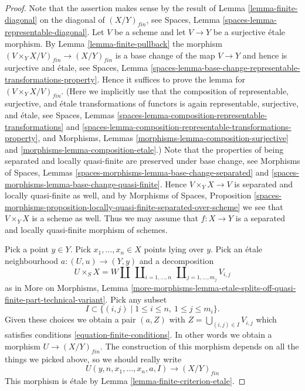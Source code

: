 \begin{proof}
Note that the assertion makes sense by the result of
Lemma \ref{lemma-finite-diagonal}
on the diagonal of $(X/Y)_{fin}$, see
Spaces, Lemma \ref{spaces-lemma-representable-diagonal}.
Let $V$ be a scheme and let $V \to Y$ be a surjective \'etale morphism. By
Lemma \ref{lemma-finite-pullback}
the morphism $(V \times_Y X/V)_{fin} \to (X/Y)_{fin}$ is
a base change of the map $V \to Y$ and hence is surjective and \'etale, see
Spaces,
Lemma \ref{spaces-lemma-base-change-representable-transformations-property}.
Hence it suffices to prove the lemma for $(V \times_Y X/V)_{fin}$.
(Here we implicitly use that the composition of representable, surjective, and
\'etale transformations of functors is again representable, surjective, and
\'etale, see
Spaces, Lemmas \ref{spaces-lemma-composition-representable-transformations} and
\ref{spaces-lemma-composition-representable-transformations-property}, and
Morphisms, Lemmas \ref{morphisms-lemma-composition-surjective} and
\ref{morphisms-lemma-composition-etale}.)
Note that the properties of being separated and locally quasi-finite
are preserved under base change, see
Morphisms of Spaces,
Lemmas \ref{spaces-morphisms-lemma-base-change-separated} and
\ref{spaces-morphisms-lemma-base-change-quasi-finite}.
Hence $V \times_Y X \to V$ is separated and locally quasi-finite as well,
and by
Morphisms of Spaces, Proposition
\ref{spaces-morphisms-proposition-locally-quasi-finite-separated-over-scheme}
we see that $V \times_Y X$ is a scheme as well.
Thus we may assume that $f : X \to Y$ is a separated and locally quasi-finite
morphism of schemes.

\medskip\noindent
Pick a point $y \in Y$. Pick $x_1, \ldots, x_n \in X$ points
lying over $y$. Pick an \'etale neighbourhood $a : (U, u) \to (Y, y)$ and a
decomposition
$$
U \times_S X =
W \coprod
\ \coprod\nolimits_{i = 1, \ldots, n}
\ \coprod\nolimits_{j = 1, \ldots, m_j}
V_{i, j}
$$
as in
More on Morphisms, Lemma
\ref{more-morphisms-lemma-etale-splits-off-quasi-finite-part-technical-variant}.
Pick any subset
$$
I \subset \{(i, j) \mid 1 \leq i \leq n, \ 1 \leq j \leq m_i\}.
$$
Given these choices we obtain a pair $(a, Z)$ with
$Z = \bigcup_{(i, j) \in I} V_{i, j}$
which satisfies conditions \ref{equation-finite-conditions}. In other words
we obtain a morphism $U \to (X/Y)_{fin}$. The construction of this morphism
depends on all the things we picked above, so we should really write
$$
U(y, n, x_1, \ldots, x_n, a, I) \longrightarrow (X/Y)_{fin}
$$
This morphism is \'etale by Lemma \ref{lemma-finite-criterion-etale}.


\end{proof}
